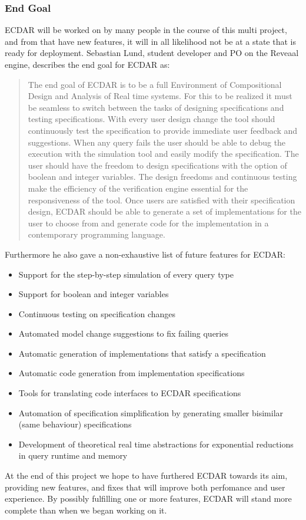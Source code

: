 \subsubsection{End Goal}
ECDAR will be worked on by many people in the course of this multi project, and from that have new features, it will in all likelihood not be at a state that is ready for deployment. Sebastian Lund, student developer and PO on the Reveaal engine, describes the end goal for ECDAR as:
\begin{quote}
    The end goal of ECDAR is to be a full Environment of Compositional Design and Analysis of Real time systems. For this to be realized it must be seamless to switch between the tasks of designing specifications and testing specifications. With every user design change the tool should continuously test the specification to provide immediate user feedback and suggestions. When any query fails the user should be able to debug the execution with the simulation tool and easily modify the specification. The user should have the freedom to design specifications with the option of boolean and integer variables. The design freedoms and continuous testing make the efficiency of the verification engine essential for the responsiveness of the tool. Once users are satisfied with their specification design, ECDAR should be able to generate a set of implementations for the user to choose from and generate code for the implementation in a contemporary programming language.
\end{quote}
Furthermore he also gave a non-exhaustive list of future features for ECDAR:
\begin{itemize}
    \item Support for the step-by-step simulation of every query type
    \item Support for boolean and integer variables
    \item Continuous testing on specification changes
    \item Automated model change suggestions to fix failing queries 
    \item Automatic generation of implementations that satisfy a specification 
    \item Automatic code generation from implementation specifications
    \item Tools for translating code interfaces to ECDAR specifications
    \item Automation of specification simplification by generating smaller bisimilar (same behaviour) specifications
    \item Development of theoretical real time abstractions for exponential reductions in query runtime and memory
\end{itemize}
At the end of this project we hope to have furthered ECDAR towards its aim, providing new features, and fixes that will improve both perfomance and user experience. By possibly fulfilling one or more features, ECDAR will stand more complete than when we began working on it.
